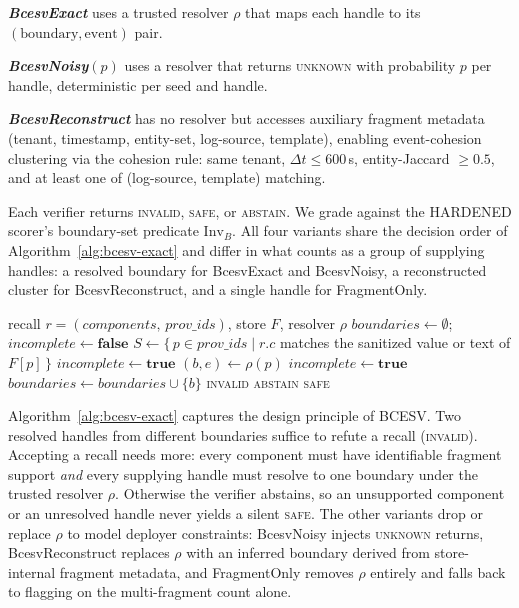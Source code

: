 \documentclass[conference,compsoc]{IEEEtran}
\begin{document}
\textbf{\textit{BcesvExact}} uses a trusted resolver $\rho$ that maps each handle to its $(\mathrm{boundary},\mathrm{event})$ pair.

\textbf{\textit{BcesvNoisy}}$(p)$ uses a resolver that returns \textsc{unknown} with probability $p$ per handle, deterministic per seed and handle.

\textbf{\textit{BcesvReconstruct}} has no resolver but accesses auxiliary fragment metadata (tenant, timestamp, entity-set, log-source, template), enabling event-cohesion clustering via the cohesion rule: same tenant, $\Delta t \leq 600$\,s, entity-Jaccard $\geq 0.5$, and at least one of (log-source, template) matching.

Each verifier returns \textsc{invalid}, \textsc{safe}, or \textsc{abstain}. We grade against the HARDENED scorer's boundary-set predicate $\mathrm{Inv}_{B}$. All four variants share the decision order of Algorithm~\ref{alg:bcesv-exact} and differ in what counts as a group of supplying handles: a resolved boundary for BcesvExact and BcesvNoisy, a reconstructed cluster for BcesvReconstruct, and a single handle for FragmentOnly.

\begin{algorithm}[!ht]
\caption{BcesvExact verification (\textsc{invalid} / \textsc{safe} / \textsc{abstain}).}
\label{alg:bcesv-exact}
\begin{algorithmic}[1]
\REQUIRE recall $r = (\mathit{components},\, \mathit{prov\_ids})$, store $F$, resolver $\rho$
\STATE $\mathit{boundaries} \gets \emptyset$;\ $\mathit{incomplete} \gets \mathbf{false}$
  \STATE $S \gets \{\, p \in \mathit{prov\_ids} \mid r.c$ matches the sanitized value or text of $F[p]\,\}$
    \STATE $\mathit{incomplete} \gets \mathbf{true}$
  \ENDIF
    \STATE $(b, e) \gets \rho(p)$
      \STATE $\mathit{incomplete} \gets \mathbf{true}$
    \ELSE
      \STATE $\mathit{boundaries} \gets \mathit{boundaries} \cup \{b\}$
    \ENDIF
  \ENDFOR
\ENDFOR
{}
  \RETURN \textsc{invalid}
  \RETURN \textsc{abstain}
\ELSE
  \RETURN \textsc{safe}
\ENDIF
\end{algorithmic}
\end{algorithm}

Algorithm~\ref{alg:bcesv-exact} captures the design principle of BCESV. Two resolved handles from different boundaries suffice to refute a recall (\textsc{invalid}). Accepting a recall needs more: every component must have identifiable fragment support \emph{and} every supplying handle must resolve to one boundary under the trusted resolver $\rho$. Otherwise the verifier abstains, so an unsupported component or an unresolved handle never yields a silent \textsc{safe}. The other variants drop or replace $\rho$ to model deployer constraints: BcesvNoisy injects \textsc{unknown} returns, BcesvReconstruct replaces $\rho$ with an inferred boundary derived from store-internal fragment metadata, and FragmentOnly removes $\rho$ entirely and falls back to flagging on the multi-fragment count alone.
\end{document}
